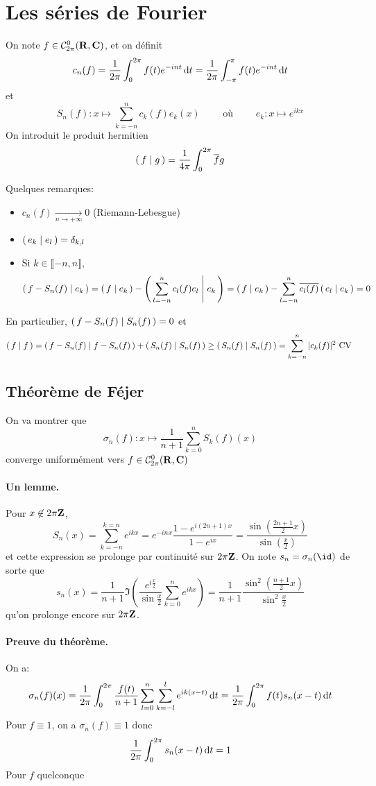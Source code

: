 \section{Les séries de Fourier}

On note $f \in  \mathcal  C^0_{2\pi}(\mathbf R, \mathbf C)$, et on définit \[
    c_n(f)= \frac{1}{2\pi}\int_0^{2\pi} f(t)e^{-int}\mathop{}\!\mathrm d t=\frac{1}{2\pi}\int_{-\pi}^\pi f(t)e^{-int}\mathop{}\!\mathrm d t
\] 
et \[
    S_n(f):x \longmapsto \sum_{k=-n}^{n} c_k(f)e_k(x) \qquad  \text{ où } \qquad e_k:x \longmapsto e^{ikx}
\] 
On introduit le produit hermitien \[
    \pscalar{f}{g}=\frac{1}{4\pi} \int_0^{2\pi} \bar{f}g
\] 

Quelques remarques: \begin{itemize}
    \item $c_n(f)\xrightarrow[n \to  +\infty]{}0$ (Riemann-Lebesgue)
    \item  $ \pscalar{e_k}{e_l}=\delta_{k,l} $
    \item Si $k \in  \llbracket -n, n \rrbracket $, \[
            \pscalar{f-S_n(f)}{e_k} = \pscalar{f}{e_k} - \pscalar{\sum_{l=-n}^{n} c_l(f)e_l}{e_k}= \pscalar f{e_k}-\sum_{l=-n}^n \bar{c_l(f)} \pscalar{e_l}{e_k} =0
    \] 
\end{itemize}
En particulier, $\pscalar{f-S_n(f)}{S_n(f)} =0$ et \[
    \pscalar{f}{f} =\pscalar{f-S_n(f)}{f-S_n(f)} + \pscalar{S_n(f)}{S_n(f)} \geq \pscalar{S_n(f)}{S_n(f)} = \sum_{k=-n}^{n} |c_k(f)|^2 \text{ CV }
\] 

\subsection{Théorème de Féjer}

On va montrer que \[
    \sigma_n(f):x \longmapsto \frac{1}{n+1}\sum_{k=0}^nS_k(f)(x)
\] 
converge uniformément vers $f \in  \mathcal  C^0_{2\pi}(\mathbf R, \mathbf C)$

\paragraph*{Un lemme.}
Pour $x \not \in  2\pi\mathbf Z$, \[
    S_n(x)= \sum_{k=-n}^{k=n} e^{ikx}=e^{-inx} \frac{1-e^{i(2n+1)x}}{1-e^{ix}}= \frac{\sin\left( \frac{2n+1}{2}x \right) }{\sin\left( \frac{x}{2} \right) }
\] 
et cette expression se prolonge par continuité sur $2\pi\mathbf Z$. On note $s_n=\sigma_n(\id)$ de sorte que \[
    s_n(x)=\frac{1}{n+1}\Im\left( \frac{e^{i\frac{x}{2}}}{\sin \frac{x}{2}}  \sum_{k=0}^{n} e^{ikx}\right) =\frac{1}{n+1} \frac{\sin^2 (\frac{n+1}{2}x)}{\sin^2 \frac{x}{2}}
\] 
qu'on prolonge encore sur $2\pi\mathbf Z$.

\paragraph*{Preuve du théorème.}
On a: \[
    \sigma_n(f)(x)=\frac{1}{2\pi}\int_0^{2\pi} \frac{f(t)}{n+1}\sum_{l=0}^n\sum_{k=-l}^l e^{ik(x-t)} \mathop{}\!\mathrm d t=\frac{1}{2\pi}\int_0^{2\pi} f(t)s_n(x-t)\mathop{}\!\mathrm d t
\] 
Pour $f\equiv 1$, on a  $\sigma_n(f)\equiv 1$ donc  \[
    \frac{1}{2\pi}\int_0^{2\pi} s_n(x-t)\mathop{}\!\mathrm d t=1
\] 
Pour $f$ quelconque
